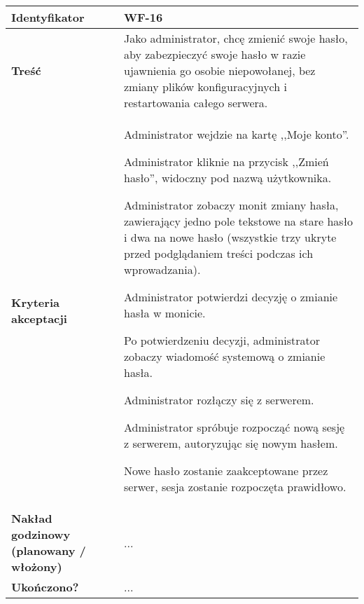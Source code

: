 \begin{tabular}{ | l | l | }
	\hline
		\textbf{Identyfikator} &
		WF-16
		\\

	\hline
		\textbf{Treść} & \parbox[t]{11.5cm}{\strut
			Jako administrator, chcę zmienić swoje hasło, aby zabezpieczyć swoje hasło w razie ujawnienia go osobie niepowołanej, bez zmiany plików konfiguracyjnych i restartowania całego serwera.
		\strut}\\

	\hline
		\parbox[t]{4cm}{\textbf{Kryteria akceptacji}} & \parbox[t]{11.5cm}{\strut
			\begin{enumreq}
				\item Administrator wejdzie na kartę ,,Moje konto''.
        \item Administrator kliknie na przycisk ,,Zmień hasło'',
        widoczny pod nazwą użytkownika.
				\item Administrator zobaczy monit zmiany hasła,
        zawierający jedno pole tekstowe na stare hasło i dwa na
        nowe hasło (wszystkie trzy ukryte przed podglądaniem
        treści podczas ich wprowadzania).
        \item Administrator potwierdzi decyzję o zmianie hasła w monicie.
        \item Po potwierdzeniu decyzji, administrator zobaczy wiadomość systemową o zmianie hasła.
        \item Administrator rozłączy się z serwerem.
        \item Administrator spróbuje rozpocząć nową sesję z
        serwerem, autoryzując się nowym hasłem.
        \item Nowe hasło zostanie zaakceptowane przez serwer,
        sesja zostanie rozpoczęta prawidłowo.
			\end{enumreq}
			\strut}
		\\

	\hline
  \parbox[t]{4cm}{\textbf{Nakład godzinowy (planowany / włożony)}} &
  \parbox[t]{11.5cm}{\strut
    ...
  \strut}\\

  \hline
    \parbox[t]{4cm}{\textbf{Ukończono?}} &
    \parbox[t]{11.5cm}{\strut
      ...
    \strut}\\
\hline
\end{tabular}

\vspace{1em}

